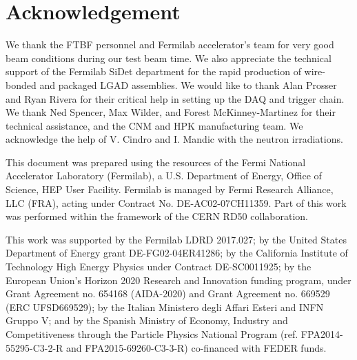 \documentclass[preprint,1p]{elsarticle}
\begin{document}
\section*{Acknowledgement}

We thank the FTBF personnel and Fermilab accelerator's team for very good beam
conditions during our test beam time. We also appreciate the technical support
of the Fermilab SiDet department for the rapid production of wire-bonded and
packaged LGAD assemblies. We would like to thank Alan Prosser and Ryan Rivera
for their critical help in setting up the DAQ and trigger chain. We thank Ned
Spencer, Max Wilder, and Forest McKinney-Martinez for their technical
assistance, and the CNM and HPK manufacturing team. We acknowledge the help of
V. Cindro and I. Mandic with the neutron irradiations. 

This document was prepared using the resources of the Fermi National Accelerator
Laboratory (Fermilab), a U.S. Department of Energy, Office of Science, HEP User
Facility. Fermilab is managed by Fermi Research Alliance, LLC (FRA), acting
under Contract No. DE-AC02-07CH11359. Part of this work was performed within the
framework of the CERN RD50 collaboration.

This work was supported by the Fermilab LDRD 2017.027; by the United States
Department of Energy grant DE-FG02-04ER41286; by the California Institute of
Technology High Energy Physics under Contract DE-SC0011925; by the European
Union's Horizon 2020 Research and Innovation funding program, under Grant
Agreement no. 654168 (AIDA-2020) and Grant Agreement no. 669529 (ERC
UFSD669529); by the Italian Ministero degli Affari Esteri and INFN Gruppo V; and
by the Spanish Ministry of Economy, Industry and Competitiveness through the
Particle Physics National Program (ref. FPA2014-55295-C3-2-R and
FPA2015-69260-C3-3-R) co-financed with FEDER funds.









{}
 




\end{document}

